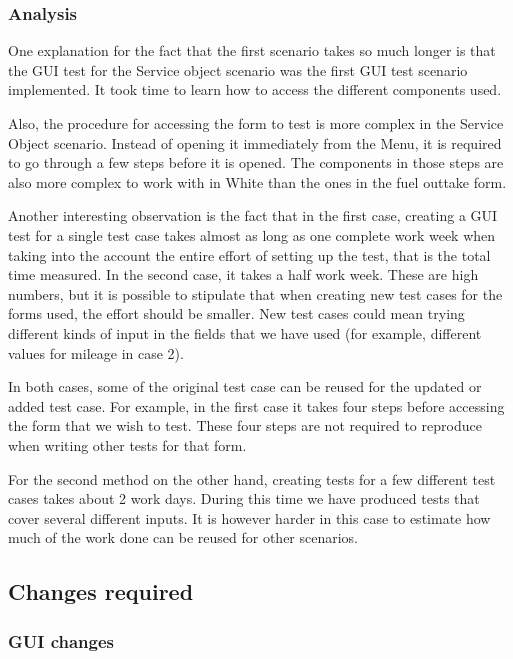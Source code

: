 \documentclass{article}
\begin{document}
			\subsubsection{Analysis}

			One explanation for the fact that the first scenario takes so much longer is that the GUI test for the Service object scenario was the first GUI test scenario implemented. It took time to learn how to access the different components used. 

			Also, the procedure for accessing the form to test is more complex in the Service Object scenario. Instead of opening it immediately from the Menu, it is required to go through a few steps before it is opened. The components in those steps are also more complex to work with in White than the ones in the fuel outtake form.
			
			Another interesting observation is the fact that in the first case, creating a GUI test for a single test case takes almost as long as one complete work week when taking into the account the entire effort of setting up the test, that is the total time measured. In the second case, it takes a half work week. These are high numbers, but it is possible to stipulate that when creating new test cases for the forms used, the effort should be smaller. New test cases could mean trying
			different kinds of input in the fields that we have used (for example, different values for mileage in case 2). 

			In both cases, some of the original test case can be reused for the updated or added test case. For example, in the first case it takes four steps before accessing the form that we wish to test. These four steps are not required to reproduce when writing other tests for that form.
			
			For the second method on the other hand, creating tests for a few different test cases takes about 2 work days. During this time we have produced tests that cover several different inputs. It is however harder in this case to estimate how much of the work done can be reused for other scenarios.


		\subsection{Changes required}

			\subsubsection{GUI changes}
\end{document}
